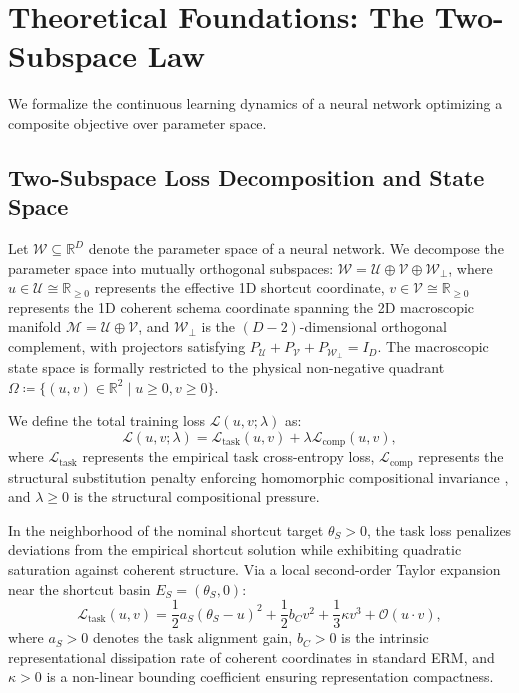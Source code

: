 \documentclass{article}
\theoremstyle{plain}
\theoremstyle{definition}
\begin{document}
\section{Theoretical Foundations: The Two-Subspace Law}
\label{sec:theory}

We formalize the continuous learning dynamics of a neural network optimizing a composite objective over parameter space.

\subsection{Two-Subspace Loss Decomposition and State Space}
Let $\mathcal{W} \subseteq \mathbb{R}^D$ denote the parameter space of a neural network. We decompose the parameter space into mutually orthogonal subspaces: $\mathcal{W} = \mathcal{U} \oplus \mathcal{V} \oplus \mathcal{W}_\perp$, where $u \in \mathcal{U} \cong \mathbb{R}_{\ge 0}$ represents the effective 1D shortcut coordinate, $v \in \mathcal{V} \cong \mathbb{R}_{\ge 0}$ represents the 1D coherent schema coordinate spanning the 2D macroscopic manifold $\mathcal{M} = \mathcal{U} \oplus \mathcal{V}$, and $\mathcal{W}_\perp$ is the $(D-2)$-dimensional orthogonal complement, with projectors satisfying $P_{\mathcal{U}} + P_{\mathcal{V}} + P_{\mathcal{W}_\perp} = I_D$. The macroscopic state space is formally restricted to the physical non-negative quadrant $\Omega \coloneqq \{ (u, v) \in \mathbb{R}^2 \mid u \ge 0, v \ge 0 \}$.

We define the total training loss $\mathcal{L}(u, v; \lambda)$ as:
\begin{equation}
    \mathcal{L}(u, v; \lambda) = \mathcal{L}_{\text{task}}(u, v) + \lambda \mathcal{L}_{\text{comp}}(u, v),
    \label{eq:total_loss}
\end{equation}
where $\mathcal{L}_{\text{task}}$ represents the empirical task cross-entropy loss, $\mathcal{L}_{\text{comp}}$ represents the structural substitution penalty enforcing homomorphic compositional invariance \citep{An2026Representational}, and $\lambda \ge 0$ is the structural compositional pressure.

In the neighborhood of the nominal shortcut target $\theta_S > 0$, the task loss penalizes deviations from the empirical shortcut solution while exhibiting quadratic saturation against coherent structure. Via a local second-order Taylor expansion near the shortcut basin $E_S = (\theta_S, 0)$:
\begin{equation}
    \mathcal{L}_{\text{task}}(u, v) = \frac{1}{2} a_S (\theta_S - u)^2 + \frac{1}{2} b_C v^2 + \frac{1}{3} \kappa v^3 + \mathcal{O}(u \cdot v),
    \label{eq:task_loss}
\end{equation}
where $a_S > 0$ denotes the task alignment gain, $b_C > 0$ is the intrinsic representational dissipation rate of coherent coordinates in standard ERM, and $\kappa > 0$ is a non-linear bounding coefficient ensuring representation compactness.
\end{document}
